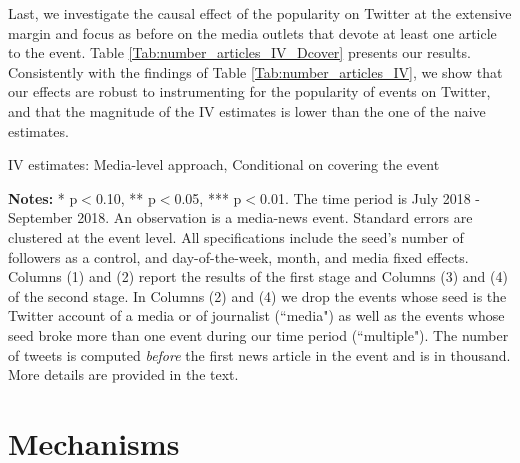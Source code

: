 Last, we investigate the causal effect of the popularity on Twitter at the extensive margin and focus as before on the media outlets that devote at least one article to the event. Table \ref{Tab:number_articles_IV_Dcover} presents our results. Consistently with the findings of Table \ref{Tab:number_articles_IV}, we show that our effects are robust to instrumenting for the popularity of events on Twitter, and that the magnitude of the IV estimates is lower than the one of the naive estimates.


\begin{table}
\caption{IV estimates: Media-level approach, Conditional on covering the event}
\begin{center}
	
\end{center}
\begin{spacing}{0.5}
	{\fns \textbf{Notes:} * p$<$0.10, ** p$<$0.05, *** p$<$0.01. The time period is July 2018 - September 2018.  An observation is a media-news event. Standard errors are clustered at the event level. All specifications include the seed's number of followers as a control, and day-of-the-week, month, and media fixed effects. Columns (1) and (2) report the results of the first stage and Columns (3) and (4) of the second stage. In Columns (2) and (4) we drop the events whose seed is the Twitter account of a media or of journalist (``media") as well as the events whose seed broke more than one event during our time period (``multiple"). The number of tweets is computed \textit{before} the first news article in the event and is in thousand. More details are provided in the text.}
\end{spacing}
\label{Tab:number_articles_IV_Dcover}
\end{table} 




\section{Mechanisms\label{Sec:Mechanisms}}




